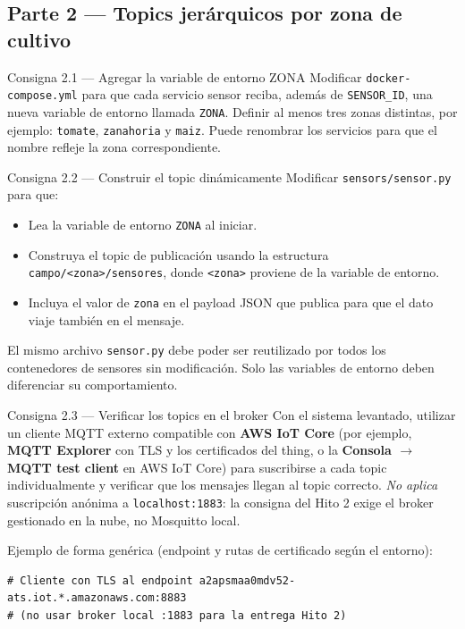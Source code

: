 \documentclass[12pt,a4paper]{article}
\begin{document}
\subsection{Parte 2 — Topics jerárquicos por zona de cultivo}

\begin{consigna}{Consigna 2.1 — Agregar la variable de entorno ZONA}
Modificar \texttt{docker-compose.yml} para que cada servicio sensor reciba,
además de \texttt{SENSOR\_ID}, una nueva variable de entorno llamada
\texttt{ZONA}. Definir al menos tres zonas distintas, por ejemplo:
\texttt{tomate}, \texttt{zanahoria} y \texttt{maiz}. Puede renombrar
los servicios para que el nombre refleje la zona correspondiente.
\end{consigna}

\begin{consigna}{Consigna 2.2 — Construir el topic dinámicamente}
Modificar \texttt{sensors/sensor.py} para que:
\begin{itemize}
  \item Lea la variable de entorno \texttt{ZONA} al iniciar.
  \item Construya el topic de publicación usando la estructura
        \texttt{campo/<zona>/sensores}, donde \texttt{<zona>} proviene
        de la variable de entorno.
  \item Incluya el valor de \texttt{zona} en el payload JSON que publica
        para que el dato viaje también en el mensaje.
\end{itemize}
El mismo archivo \texttt{sensor.py} debe poder ser reutilizado por todos
los contenedores de sensores sin modificación. Solo las variables de entorno
deben diferenciar su comportamiento.
\end{consigna}

\begin{consigna}{Consigna 2.3 — Verificar los topics en el broker}
Con el sistema levantado, utilizar un cliente MQTT externo compatible con
\textbf{AWS IoT Core} (por ejemplo, \textbf{MQTT Explorer} con TLS y los certificados del thing,
o la \textbf{Consola $\rightarrow$ MQTT test client} en AWS IoT Core) para suscribirse
a cada topic individualmente y verificar que los mensajes llegan al topic correcto.
\textit{No aplica} suscripción anónima a \texttt{localhost:1883}: la consigna del Hito 2 exige el broker
gestionado en la nube, no Mosquitto local.

Ejemplo de forma genérica (endpoint y rutas de certificado según el entorno):
\begin{lstlisting}[style=texto]
# Cliente con TLS al endpoint a2apsmaa0mdv52-ats.iot.*.amazonaws.com:8883
# (no usar broker local :1883 para la entrega Hito 2)
\end{lstlisting}
\end{consigna}
\end{document}

